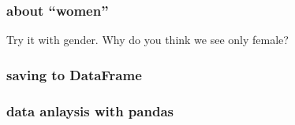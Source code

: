 \documentclass[11pt]{article}
\begin{document}
\subsubsection{about “women”}
\label{sec:orgcef25c5}
Try it with gender. Why do you think we see only female?

\subsubsection{saving to DataFrame}
\label{sec:orgccb8f37}

\subsubsection{data anlaysis with pandas}
\label{sec:orgae30460}
\end{document}
